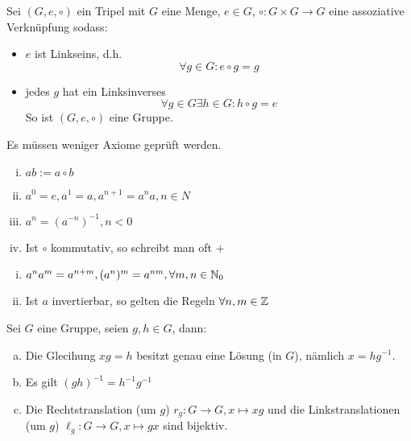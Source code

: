 \documentclass[a4paper]{report}
\begin{document}
\begin{satz}%
  Sei $(G, e, \circ)$ ein Tripel  mit $G$ eine Menge, $e \in G$, $\circ : G \times G \to G$ eine assoziative Verknüpfung sodass:
  \begin{itemize}
    \item  $e$ ist Linkseins, d.h.
    $$\forall g \in G : e \circ g = g$$
    \item jedes $g$ hat ein Linksinverses $$\forall g \in G \exists h \in G : h \circ g = e$$
    So ist $(G, e, \circ)$ eine Gruppe.
  \end{itemize}
\end{satz}
\begin{hin*}
  Es müssen weniger Axiome geprüft werden.
\end{hin*}
\begin{nota*}
  \item
  \begin{enumerate}[(i)]
\item $ab := a \circ b$
\item $a^{0} = e, a^{1}=a, a^{n+1}=a^{n}a, n \in N$
    \item $a^{n} = (a^{-n})^{-1}, n < 0$

\item  Ist $\circ$ kommutativ, so schreibt man oft $+$
  \end{enumerate}
\end{nota*}
\begin{ubng*}[Rechenregeln]
  \item
  \begin{enumerate}[(i)]
\item  $a^{n}a^{m}=a^{n+m}, (a^{n})^{m}=a^{nm}, \forall m,n \in \Bbb N_{0}$
\item  Ist $a$ invertierbar, so gelten die Regeln $\forall n,m \in \Bbb Z$
  \end{enumerate}
\end{ubng*}

\begin{prop}[Übung]
  Sei $G$ eine Gruppe, seien $g,h \in G$, dann:
  \begin{enumerate}[(a)]
    \item Die Glecihung $xg = h$ besitzt genau eine Lösung (in $G$), nämlich $x=hg^{-1}$.
    \item Es gilt $(gh)^{-1} = h^{-1}g^{-1}$
    \item Die Rechtstranslation (um $g$) $r_{g}: G \to G, x \mapsto xg$ und die Linkstranslationen (um $g$) $\ell_{g}: G \to G, x \mapsto gx$
    sind bijektiv.

  \end{enumerate}
\end{prop}
\end{document}
